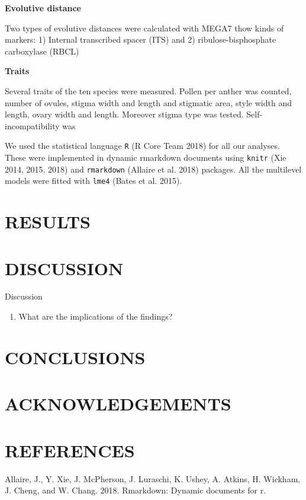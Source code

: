 \documentclass[11pt,a4paper]{article}
\providecommand{\tightlist}{%
  \setlength{\itemsep}{0pt}\setlength{\parskip}{0pt}}
\begin{document}
\textbf{Evolutive distance}

Two types of evolutive distances were calculated with MEGA7 thow kinds
of markers: 1) Internal transcribed spacer (ITS) and 2)
ribulose-bisphosphate carboxylase (RBCL)

\textbf{Traits}

Several traits of the ten species were measured. Pollen per anther was
counted, number of ovules, stigma width and length and stigmatic area,
style width and length, ovary width and length. Moreover stigma type was
tested. Self-incompatibility was

We used the statistical language \texttt{R} (R Core Team 2018) for all
our analyses. These were implemented in dynamic rmarkdown documents
using \texttt{knitr} (Xie 2014, 2015, 2018) and \texttt{rmarkdown}
(Allaire et al. 2018) packages. All the multilevel models were fitted
with \texttt{lme4} (Bates et al. 2015).

\section{RESULTS}\label{results}

\section{DISCUSSION}\label{discussion}

Discussion

\begin{enumerate}
\def\labelenumi{\arabic{enumi}.}
\tightlist
\item
  What are the implications of the findings?
\end{enumerate}

\section{CONCLUSIONS}\label{conclusions}

\section{ACKNOWLEDGEMENTS}\label{acknowledgements}

\section{REFERENCES}\label{references}

\hypertarget{refs}{}
\hypertarget{ref-Allaire_2018}{}
Allaire, J., Y. Xie, J. McPherson, J. Luraschi, K. Ushey, A. Atkins, H.
Wickham, J. Cheng, and W. Chang. 2018. Rmarkdown: Dynamic documents for
r.
\end{document}
